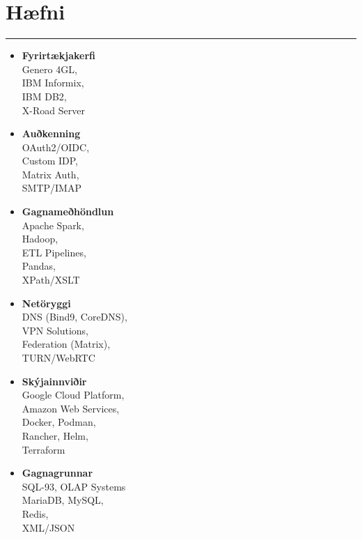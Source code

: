 \documentclass[a4paper,10pt]{article}
\newcommand{\cvheading}[1]{%
  {\headingfont\section*{#1}}
  \vspace{-0.2cm}
  \hrule
  \vspace{0.2cm}
}
\begin{document}
\cvheading{Hæfni}
\begin{multicols}{3}
	\begin{itemize}[nosep, leftmargin=*]
		\item \textbf{Fyrirtækjakerfi}\\
		      Genero 4GL,\\
		      IBM Informix,\\
		      IBM DB2,\\
		      X-Road Server

		\item \textbf{Auðkenning}\\
		      OAuth2/OIDC,\\
		      Custom IDP,\\
		      Matrix Auth,\\
		      SMTP/IMAP

		\item \textbf{Gagnameðhöndlun}\\
		      Apache Spark,\\
		      Hadoop,\\
		      ETL Pipelines,\\
		      Pandas,\\
		      XPath/XSLT

		      \columnbreak

		\item \textbf{Netöryggi}\\
		      DNS (Bind9, CoreDNS),\\
		      VPN Solutions,\\
		      Federation (Matrix),\\
		      TURN/WebRTC

		\item \textbf{Skýjainnviðir}\\
		      Google Cloud Platform,\\
		      Amazon Web Services,\\
		      Docker, Podman,\\
		      Rancher, Helm,\\
		      Terraform

		\item \textbf{Gagnagrunnar}\\
		      SQL-93, OLAP Systems\\
		      MariaDB, MySQL,\\
		      Redis,\\
		      XML/JSON

		      \columnbreak


\end{itemize}
\end{multicols}
\end{document}

